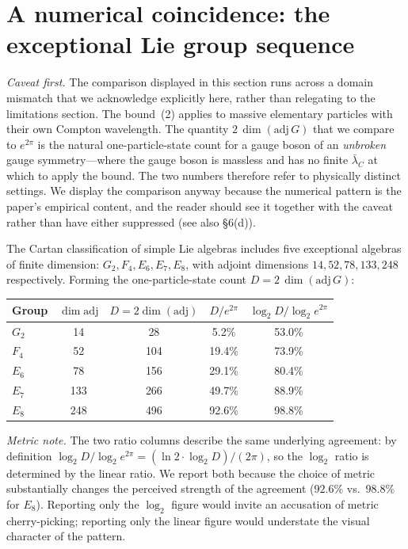 \documentclass[11pt]{article}
\newcommand{\lbar}{\bar\lambda_{C}}
\begin{document}
\section{A numerical coincidence: the exceptional Lie group sequence}

\textit{Caveat first.} The comparison displayed in this section runs across a domain mismatch that we
acknowledge explicitly here, rather than relegating to the limitations section. The bound~(2) applies
to massive elementary particles with their own Compton wavelength. The quantity
$2\,\dim(\mathrm{adj}\,G)$ that we compare to $e^{2\pi}$ is the natural one-particle-state count for a
gauge boson of an \emph{unbroken} gauge symmetry---where the gauge boson is massless and has no finite
$\lbar$ at which to apply the bound. The two numbers therefore refer to physically distinct settings.
We display the comparison anyway because the numerical pattern is the paper's empirical content, and
the reader should see it together with the caveat rather than have either suppressed (see also
\S6(d)).

The Cartan classification of simple Lie algebras includes five exceptional algebras of finite
dimension: $G_{2}, F_{4}, E_{6}, E_{7}, E_{8}$, with adjoint dimensions $14, 52, 78, 133, 248$
respectively. Forming the one-particle-state count $D = 2\,\dim(\mathrm{adj}\,G)$:
\begin{center}
\begin{tabular}{lcccc}
\toprule
Group & $\dim\mathrm{adj}$ & $D = 2\dim(\mathrm{adj})$ & $D/e^{2\pi}$ & $\log_{2} D/\log_{2} e^{2\pi}$ \\
\midrule
$G_{2}$ & 14  & 28  & 5.2\%  & 53.0\% \\
$F_{4}$ & 52  & 104 & 19.4\% & 73.9\% \\
$E_{6}$ & 78  & 156 & 29.1\% & 80.4\% \\
$E_{7}$ & 133 & 266 & 49.7\% & 88.9\% \\
$E_{8}$ & 248 & 496 & 92.6\% & 98.8\% \\
\bottomrule
\end{tabular}
\end{center}

\textit{Metric note.} The two ratio columns describe the same underlying agreement: by definition
$\log_{2} D/\log_{2} e^{2\pi} = (\ln 2 \cdot \log_{2} D)/(2\pi)$, so the $\log_{2}$ ratio is
determined by the linear ratio. We report both because the choice of metric substantially changes the
perceived strength of the agreement ($92.6\%$ vs.\ $98.8\%$ for $E_{8}$). Reporting only the
$\log_{2}$ figure would invite an accusation of metric cherry-picking; reporting only the linear
figure would understate the visual character of the pattern.
\end{document}
